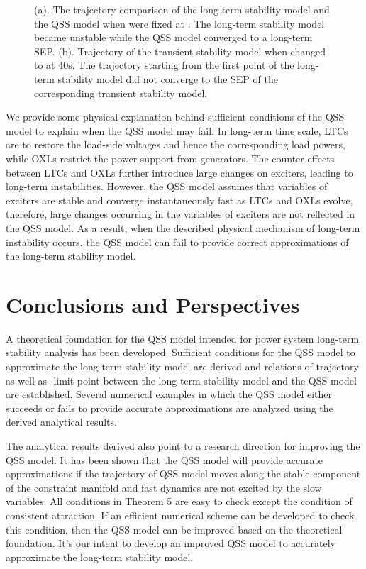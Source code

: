 \documentclass[journal]{IEEEtran}
\begin{document}
\begin{figure}\centering
{}
\caption{(a). The trajectory comparison of the long-term stability model and the QSS model when  were fixed at . The long-term stability model became unstable while the QSS model converged to a long-term SEP. (b). Trajectory of the transient stability model when  changed to  at 40s. The trajectory starting from the first point of the long-term stability model did not converge to the SEP of the corresponding transient stability model.}
\end{figure}

We provide some physical explanation behind sufficient conditions of the QSS model to explain when the QSS model may fail. In long-term time scale, LTCs are to restore the load-side voltages and hence the corresponding load powers, while OXLs restrict the power support from generators\cite{Cutsem:artical}. The counter effects between LTCs and OXLs further introduce large changes on exciters, leading to long-term instabilities. However, the QSS model assumes that variables of exciters are stable and converge instantaneously fast as LTCs and OXLs evolve, therefore, large changes occurring in the variables of exciters are not reflected in the QSS model. As a result, when the described physical mechanism of long-term instability occurs, the QSS model can fail to provide correct approximations of the long-term stability model.

\section{Conclusions and Perspectives}\label{conclusion}
A theoretical foundation for the QSS model intended for power system long-term stability analysis has been developed. Sufficient conditions for the QSS model to approximate the long-term stability model are derived and relations of trajectory as well as -limit point between the long-term stability model and the QSS model are established. Several numerical examples in which the QSS model either succeeds or fails to provide accurate approximations are analyzed using the derived analytical results.

The analytical results derived also point to a research direction for improving the QSS model. It has been shown that the QSS model will provide accurate approximations if the trajectory of QSS model moves along the stable component of the constraint manifold and fast dynamics are not excited by the slow variables. All conditions in Theorem 5 are easy to check except the condition of consistent attraction. If an efficient numerical scheme can be developed to check this condition, then the QSS model can be improved based on the theoretical foundation. It's our intent to develop an improved QSS model to accurately approximate the long-term stability model.
\end{document}
